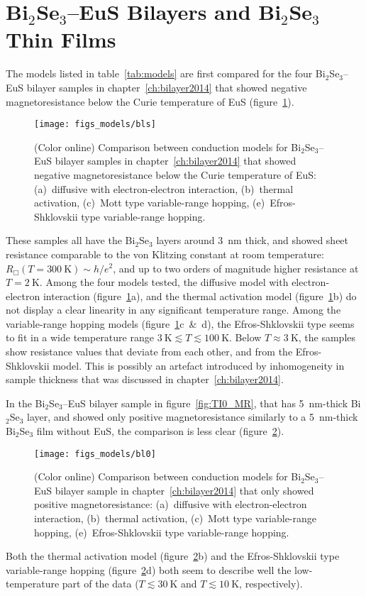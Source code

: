 \section{Bi$_2$Se$_3$--EuS Bilayers and Bi$_2$Se$_3$ Thin Films}
The models listed in table~\ref{tab:models} are first compared for the four Bi$_2$Se$_3$--EuS bilayer samples in chapter~\ref{ch:bilayer2014} that showed negative magnetoresistance below the Curie temperature of EuS (figure~\ref{fig:models_bls}). %
\begin{figure}[ht]%
    \centering%
    \texttt{[image: figs\_models/bls]}%
    \caption[Conduction model comparison: Bi$_2$Se$_3$--EuS bilayers: BL1--BL3]{\label{fig:models_bls}(Color online) Comparison between conduction models for Bi$_2$Se$_3$--EuS bilayer samples in chapter~\ref{ch:bilayer2014} that showed negative magnetoresistance below the Curie temperature of EuS: (a)~diffusive with electron-electron interaction, (b)~thermal activation, (c)~Mott type variable-range hopping, (e)~Efros-Shklovskii type variable-range hopping.}%
\end{figure}%
%
These samples all have the Bi$_2$Se$_3$ layers around \SI{3}{nm} thick, and showed sheet resistance comparable to the von Klitzing constant at room temperature: $R_\Box(T=300~\mathrm{K}) \sim h/e^2$, and up to two orders of magnitude higher resistance at $T = 2~\mathrm{K}$. Among the four models tested, the diffusive model with electron-electron interaction (figure~\ref{fig:models_bls}a), and the thermal activation model (figure~\ref{fig:models_bls}b) do not display a clear linearity in any significant temperature range. Among the variable-range hopping models (figure~\ref{fig:models_bls}c~\&~d), the Efros-Shklovskii type seems to fit in a wide temperature range $3~\mathrm{K} \lesssim T \lesssim 100~\mathrm{K}$. Below $T \approx 3~\mathrm{K}$, the samples show resistance values that deviate from each other, and from the Efros-Shklovskii model. This is possibly an artefact introduced by inhomogeneity in sample thickness that was discussed in chapter~\ref{ch:bilayer2014}.

In the Bi$_2$Se$_3$--EuS bilayer sample in figure~\ref{fig:TI0_MR}, that has \SI{5}{nm}-thick Bi$_2$Se$_3$ layer, and showed only positive magnetoresistance similarly to a \SI{5}{nm}-thick Bi$_2$Se$_3$ film without EuS, the comparison is less clear (figure~\ref{fig:models_bl0}). %
\begin{figure}[ht]%
    \centering%
    \texttt{[image: figs\_models/bl0]}%
    \caption[Conduction model comparison: Bi$_2$Se$_3$--EuS bilayer: BL0]{\label{fig:models_bl0}(Color online) Comparison between conduction models for Bi$_2$Se$_3$--EuS bilayer sample in chapter~\ref{ch:bilayer2014} that only showed positive magnetoresistance: (a)~diffusive with electron-electron interaction, (b)~thermal activation, (c)~Mott type variable-range hopping, (e)~Efros-Shklovskii type variable-range hopping.}%
\end{figure}%
%
Both the thermal activation model (figure~\ref{fig:models_bl0}b) and the Efros-Shklovskii type variable-range hopping (figure~\ref{fig:models_bl0}d) both seem to describe well the low-temperature part of the data ($T \lesssim 30~\mathrm{K}$ and $T \lesssim 10~\mathrm{K}$, respectively).